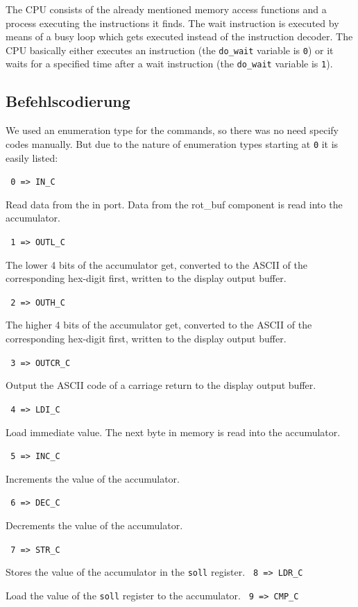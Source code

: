 \documentclass[a4paper,10pt]{scrartcl}
\begin{document}
The CPU consists of the already mentioned memory access functions and
a process executing the instructions it finds. The wait instruction is
executed by means of a busy loop which gets executed instead of the
instruction decoder. The CPU basically either executes an instruction
(the \texttt{do\_wait} variable is \texttt{0}) or it waits for a
specified time after a wait instruction (the \texttt{do\_wait} variable
is \texttt{1}).

\subsection{Befehlscodierung}
\label{sec:bef_cod}

We used an enumeration type for the commands, so there was no need
specify codes manually. But due to the nature of enumeration types
starting at \texttt{0} it is easily listed:

\noindent\texttt{ 0  =>  IN\_C}

Read data from the in port. Data from the rot\_buf component is read into the accumulator.

\noindent\texttt{ 1  =>  OUTL\_C}

The lower 4 bits of the accumulator get, converted to the ASCII of the
corresponding hex-digit first, written to the display output buffer.

\noindent\texttt{ 2  =>  OUTH\_C}

The higher 4 bits of the accumulator get, converted to the ASCII of the
corresponding hex-digit first, written to the display output buffer.

\noindent\texttt{ 3  =>  OUTCR\_C}

Output the ASCII code of a carriage return to the display output buffer.

\noindent\texttt{ 4  =>  LDI\_C}

Load immediate value. The next byte in memory is read into the accumulator.

\noindent\texttt{ 5  =>  INC\_C}

Increments the value of the accumulator.

\noindent\texttt{ 6  =>  DEC\_C}

Decrements the value of the accumulator.

\noindent\texttt{ 7  =>  STR\_C}

Stores the value of the accumulator in the \texttt{soll} register.
\noindent\texttt{ 8  =>  LDR\_C}

Load the value of the \texttt{soll} register to the accumulator.
\noindent\texttt{ 9  =>  CMP\_C}
\end{document}
